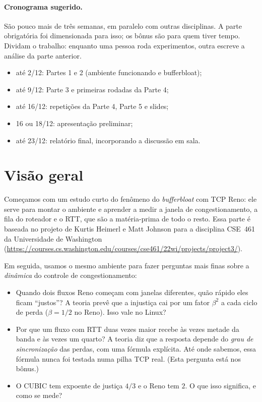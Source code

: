 \documentclass[11pt,a4paper]{article}
\begin{document}
\paragraph{Cronograma sugerido.} São pouco mais de três semanas, em paralelo com outras
disciplinas. A parte obrigatória foi dimensionada para isso; os bônus são para quem
tiver tempo. Dividam o trabalho: enquanto uma pessoa roda experimentos, outra escreve a
análise da parte anterior.
\begin{itemize}
\item até 2/12: Partes 1 e 2 (ambiente funcionando e bufferbloat);
\item até 9/12: Parte 3 e primeiras rodadas da Parte 4;
\item até 16/12: repetições da Parte 4, Parte 5 e slides;
\item 16 ou 18/12: apresentação preliminar;
\item até 23/12: relatório final, incorporando a discussão em sala.
\end{itemize}

\tableofcontents

\section{Visão geral}

Começamos com um estudo curto do fenômeno do \emph{bufferbloat} com TCP Reno: ele serve
para montar o ambiente e aprender a medir a janela de congestionamento, a fila do
roteador e o RTT, que são a matéria-prima de todo o resto. Essa parte é baseada no projeto
de Kurtis Heimerl e Matt Johnson para a disciplina CSE~461 da Universidade de Washington
(\url{https://courses.cs.washington.edu/courses/cse461/22wi/projects/project3/}).

Em seguida, usamos o mesmo ambiente para fazer perguntas mais finas sobre a
\emph{dinâmica} do controle de congestionamento:
\begin{itemize}
\item Quando dois fluxos Reno começam com janelas diferentes, quão rápido eles ficam
“justos”? A teoria prevê que a injustiça cai por um fator $\beta^2$ a cada ciclo de
perda ($\beta=1/2$ no Reno). Isso vale no Linux?
\item Por que um fluxo com RTT duas vezes maior recebe às vezes metade da banda e às
vezes um quarto? A teoria diz que a resposta depende do \emph{grau de sincronização}
das perdas, com uma fórmula explícita. Até onde sabemos, essa fórmula nunca foi
testada numa pilha TCP real. (Esta pergunta está nos bônus.)
\item O CUBIC tem expoente de justiça $4/3$ e o Reno tem $2$. O que isso significa, e
como se mede?
\end{itemize}
\end{document}
